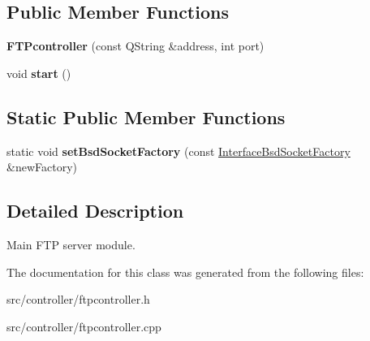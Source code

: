 \subsection*{Public Member Functions}
\begin{DoxyCompactItemize}
\item 
\mbox{\label{classFTPcontroller_aee9902900896bb6d19819cf33835e938}} 
{\bfseries F\+T\+Pcontroller} (const Q\+String \&address, int port)
\item 
\mbox{\label{classFTPcontroller_aa828486ab01a8f6bacc7c99585294a50}} 
void {\bfseries start} ()
\end{DoxyCompactItemize}
\subsection*{Static Public Member Functions}
\begin{DoxyCompactItemize}
\item 
\mbox{\label{classFTPcontroller_acea265b87e5d776e4943e71888411271}} 
static void {\bfseries set\+Bsd\+Socket\+Factory} (const \hyperlink{classInterfaceBsdSocketFactory}{Interface\+Bsd\+Socket\+Factory} \&new\+Factory)
\end{DoxyCompactItemize}


\subsection{Detailed Description}
Main F\+TP server module. 

The documentation for this class was generated from the following files\+:\begin{DoxyCompactItemize}
\item 
src/controller/ftpcontroller.\+h\item 
src/controller/ftpcontroller.\+cpp\end{DoxyCompactItemize}
